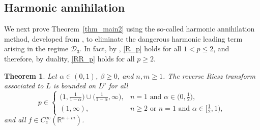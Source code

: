 \documentclass[12pt]{amsart}
\newtheorem{theorem}{Theorem}[section]
\begin{document}
\subsection{Harmonic annihilation}
We next prove Theorem~\ref{thm_main2} using the so-called harmonic annihilation method, developed from \cite{H2}, to eliminate the dangerous harmonic leading term arising in the regime $\mathcal{D}_3$. In fact, by \cite{RS}, \eqref{R_p} holds for all $1<p\le 2$, and therefore, by duality, \eqref{RR_p} holds for all $p\ge 2$. 







\begin{theorem}\label{prop_RR}
Let $\alpha\in (0,1)$, $\beta \ge 0$, and $n,m\ge 1$. The reverse Riesz transform associated to $L$ is bounded on $L^p$ for all 
\begin{equation}\label{p3}
   p\in \begin{cases}
        \bigl(1,\frac{1}{1-\alpha}\bigr) \cup \bigl(\frac{1}{1-\alpha},\infty \bigr), & n=1 \text{ and } \alpha \in \bigl(0,\frac{1}{2}\bigr),\\[4pt]
        (1,\infty), & n\ge 2 \text{ or } n=1 \text{ and } \alpha\in \bigl[\frac{1}{2},1\bigr),
    \end{cases}
\end{equation}
and all $f\in C_c^\infty(\mathbb{R}^{n+m})$.
\end{theorem}
\end{document}
